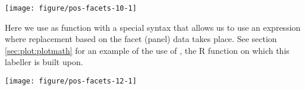 \documentclass[krantz2]{krantz}\usepackage{knitr}%
\begin{document}
\begin{knitrout}\footnotesize
{}\color{fgcolor}\begin{kframe}
\begin{alltt}
 \hlopt{+}  \hlopt{~}   
\end{alltt}
\end{kframe}

{\centering \texttt{[image: figure/pos-facets-10-1]} 

}



\end{knitrout}

\begin{knitrout}\footnotesize
{}\color{fgcolor}\begin{kframe}
\begin{alltt}
\hlopt{$} \hlkwb{<-} \hlopt{$}
                        \hlstd{=} \hlstd{(}\hlstd{,} \hlstd{,} \hlstd{))}
 \hlkwb{<-} \hlstd{(}   \hlopt{+}
      \hlstd{()} \hlopt{+}
       \hlopt{~}   
\end{alltt}
\end{kframe}
\end{knitrout}

Here we use as  function  with a special syntax that allows us to use an expression where replacement based on the facet (panel) data takes place. See section \ref{sec:plot:plotmath} for an example of the use of , the R function on which this labeller is built upon.

\begin{knitrout}\footnotesize
{}\color{fgcolor}\begin{kframe}
\begin{alltt}
 \hlopt{+}  \hlopt{~}   \hlstd{=}  \hlopt{^} 
\end{alltt}
\end{kframe}

{\centering \texttt{[image: figure/pos-facets-12-1]} 

}



\end{knitrout}
\end{document}
